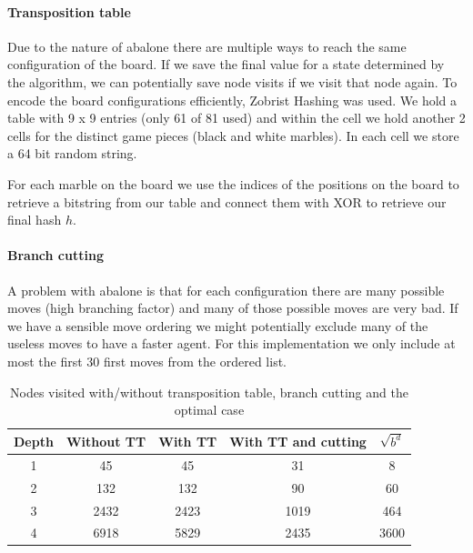 \documentclass{llncs}
\begin{document}
\paragraph{Transposition table}
Due to the nature of abalone there are multiple ways to reach the same configuration of the board. If we save the final value for a state determined by the algorithm, we can potentially save node visits if we visit that node again. To encode the board configurations efficiently, Zobrist Hashing \cite{noauthor_zobrist_nodate} was used. We hold a table with 9 x 9 entries (only 61 of 81 used) and within the cell we hold another 2 cells for the distinct game pieces (black and white marbles). In each cell we store a 64 bit random string.

For each marble on the board we use the indices of the positions on the board to retrieve a bitstring from our table and connect them with XOR to retrieve our final hash $h$.

\paragraph{Branch cutting}
A problem with abalone is that for each configuration there are many possible moves (high branching factor) and many of those possible moves are very bad. If we have a sensible move ordering we might potentially exclude many of the useless moves to have a faster agent. For this implementation we only include at most the first 30 first moves from the ordered list.

\begin{table}
  \begin{center}
    \begin{tabular}{ | c | c | c | c | c | }
      \hline
      Depth & Without TT & With TT & With TT and cutting & $\sqrt{b^d}$ \\
      \hline
      1     & 45         & 45      & 31                  & 8            \\
      \hline
      2     & 132        & 132     & 90                  & 60           \\
      \hline
      3     & 2432       & 2423    & 1019                & 464          \\
      \hline
      4     & 6918       & 5829    & 2435                & 3600         \\
      \hline
    \end{tabular}
  \end{center}
  \caption{Nodes visited with/without transposition table, branch cutting and the optimal case}
  \label{node_count}
\end{table}
\end{document}
